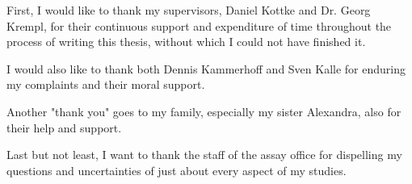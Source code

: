 \label{acknowledgement}

First, I would like to thank my supervisors, Daniel Kottke and Dr. Georg Krempl, for their continuous support and expenditure of time throughout the process of writing this thesis, without which I could not have finished it.

I would also like to thank both Dennis Kammerhoff and Sven Kalle for enduring my complaints and their moral support.

Another "thank you" goes to my family, especially my sister Alexandra, also for their help and support.

Last but not least, I want to thank the staff of the assay office for dispelling my questions and uncertainties of just about every aspect of my studies.